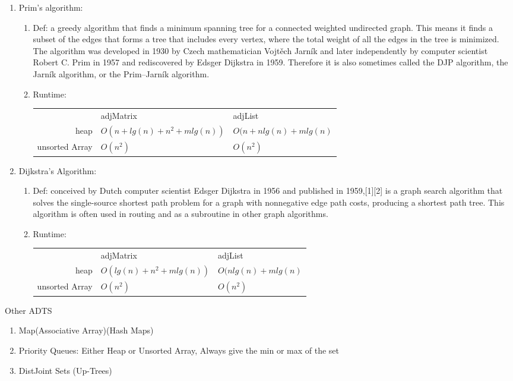 \documentclass[12pt]{article}
\renewcommand{\=}[1]{\stackrel{#1}{=}} %
\theoremstyle{definition}
\theoremstyle{remark}
\begin{document}
\begin{enumerate}
\begin{enumerate}
\begin{enumerate}
      \item Prim's algorithm:
        \begin{enumerate}
        \item Def: a greedy algorithm that finds a minimum spanning
          tree for a connected weighted undirected graph. This means
          it finds a subset of the edges that forms a tree that
          includes every vertex, where the total weight of all the
          edges in the tree is minimized. The algorithm was developed
          in 1930 by Czech mathematician Vojtěch Jarník and later
          independently by computer scientist Robert C. Prim in 1957
          and rediscovered by Edsger Dijkstra in 1959. Therefore it is
          also sometimes called the DJP algorithm, the Jarník
          algorithm, or the Prim–Jarník algorithm.
        \item Runtime:
          \begin{tabular*}{1.0\linewidth}{r l l}
                  & adjMatrix & adjList\\
             heap & $O(n+lg(n)+n^2+mlg(n))$ & $O(n+nlg(n)+mlg(n)$\\
             unsorted Array & $O(n^2)$ & $O(n^2)$
          \end{tabular*}

        \end{enumerate}

      \item Dijkstra’s Algorithm:
        \begin{enumerate}
        \item Def: conceived by Dutch computer scientist Edsger Dijkstra in 1956 and published in 1959,[1][2] is a graph search algorithm that solves the single-source shortest path problem for a graph with nonnegative edge path costs, producing a shortest path tree. This algorithm is often used in routing and as a subroutine in other graph algorithms.
        \item Runtime:
          \begin{tabular*}{1.0\linewidth}{r l l}
                  & adjMatrix & adjList\\
             heap & $O(lg(n)+n^2+mlg(n))$ & $O(nlg(n)+mlg(n)$\\
             unsorted Array & $O(n^2)$ & $O(n^2)$
          \end{tabular*}
        \end{enumerate}

      \end{enumerate}
    \end{enumerate}
    Other ADTS
    \begin{enumerate}
    \item Map(Associative Array)(Hash Maps)
    \item Priority Queues: Either Heap or Unsorted Array, Always give
      the min or max of the set
    \item DistJoint Sets (Up-Trees)
    \end{enumerate}
  \end{enumerate}
  
\end{document}

